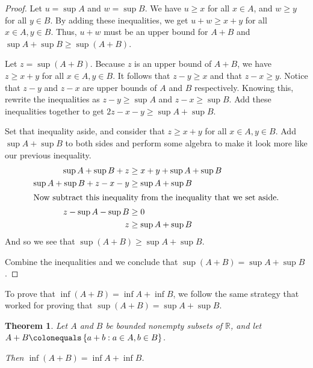 \documentclass[12pt]{article}
\newtheorem*{thm}{Theorem}
\begin{document}
\begin{proof}
Let $u = \sup A$ and $w = \sup B$. We have $u \geq x$ for all $x \in A$, and $w \geq y$ for all $y \in B$. By adding these inequalities, we get $u + w \geq x + y$ for all $x \in A, y \in B$. Thus, $u + w$ must be an upper bound for $A + B$ and $\sup A + \sup B \geq \sup \left(A + B\right)$.

Let $z = \sup\left(A + B\right)$. Because $z$ is an upper bound of $A + B$, we have $z \geq x + y$ for all $x \in A, y \in B$. It follows that $z - y \geq x$ and that $z - x \geq y$. Notice that $z - y$ and $z - x$ are upper bounds of $A$ and $B$ respectively. Knowing this, rewrite the inequalities as $z - y \geq \sup A$ and $z - x \geq \sup B$. Add these inequalities together to get $2z - x - y \geq \sup A + \sup B$.

Set that inequality aside, and consider that $z \geq x + y$ for all $x \in A, y \in B$. Add $\sup A + \sup B$ to both sides and perform some algebra to make it look more like our previous inequality.
\begin{align*}
\sup A + \sup B + z &\geq x + y + \sup A + \sup B\\
\sup A + \sup B + z - x - y &\geq \sup A + \sup B\\
\intertext{Now subtract this inequality from the inequality that we set aside.}
z - \sup A - \sup B &\geq 0\\
z &\geq \sup A +\sup B \\
\end{align*}
And so we see that $\sup\left(A + B\right) \geq \sup A + \sup B$.

Combine the inequalities and we conclude that $\sup\left(A + B\right) = \sup A + \sup B$.
\end{proof}

To prove that $\inf\left(A + B\right) = \inf A + \inf B$, we follow the same strategy that worked for proving that $\sup\left(A + B\right) = \sup A + \sup B$.

\begin{thm}
Let $A$ and $B$ be bounded nonempty subsets of $\mathbb{R}$, and let $A + B \colonequals \left\{a + b : a \in A, b \in B\right\}$.

Then $\inf\left(A + B\right) = \inf A + \inf B$.
\end{thm}
\end{document}
